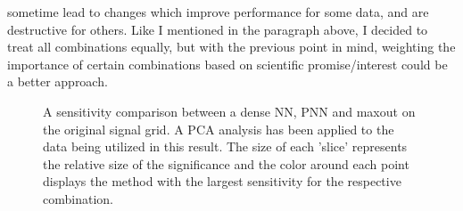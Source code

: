 sometime lead to changes which improve performance for some data, and are destructive for others. Like I mentioned in the paragraph above, I decided 
to treat all combinations equally, but with the previous point in mind, weighting the importance of certain combinations based on scientific promise/interest
could be a better approach. 
\begin{figure}
    \caption[A sensitivity comparison between a dense \acs{NN}, \acs{PNN} and maxout  on the original 
    signal grid. A \acs{PCA} analysis has been applied to the data being utilized in this result.]{A sensitivity 
    comparison between a dense \ac{NN}, \ac{PNN} and maxout on the original signal grid. A \ac{PCA} analysis 
    has been applied to the data being utilized in this result. The size of each 'slice' represents the 
    relative size of the significance and the color around each point displays the method with the largest 
    sensitivity for the respective combination.}
    \label{fig:PCAComp}
\end{figure}
